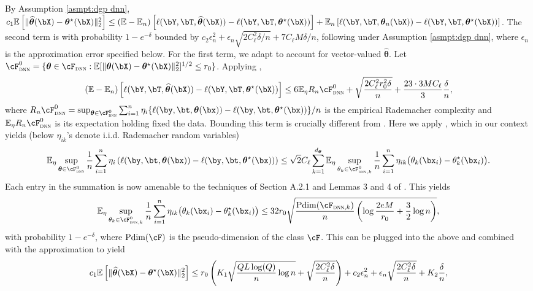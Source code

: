 \documentclass[12pt]{article}
\numberwithin{equation}{section}
\theoremstyle{definition}
\newcommand{\E}{\mathbb{E}}
\newcommand{\btheta}{\boldsymbol{\theta}}
\newcommand{\ttrue}{\theta^\star}
\newcommand{\bttrue}{\btheta^\star}
\newcommand{\bthat}{\bm{\widehat{\theta}}}
\newcommand{\dtheta}{d_{\btheta}}  %
\begin{document}
By Assumption \ref{asmpt:dgp dnn}, $ c_1 \E \left[ \|\bthat(\bX) - \bttrue (\bX) \|_2^2 \right]  \leq \left( \E - \E_n \right)\left[ \ell(\bY,\bT,\bthat(\bX)) - \ell(\bY,\bT,\bttrue(\bX)) \right] + \E_n \left[ \ell(\bY,\bT,\btheta_n(\bX)) - \ell(\bY,\bT,\bttrue(\bX)) \right]$. 
The second term is with probability $1-e^{-\delta}$ bounded by $c_2 \epsilon_n^2 + \epsilon_n \sqrt{ 2C_\ell^2 \delta  / n} + 7 C_\ell M \delta/n$, following \cite[Equation (A.2)]{Farrell-Liang-Misra2021_Ecma} under Assumption \ref{asmpt:dgp dnn}, where $\epsilon_n$ is the approximation error specified below. For the first term, we adapt \cite{Farrell-Liang-Misra2021_Ecma} to account for vector-valued $\bthat$. Let $\cF^0_{\textsc{dnn}} = \{ \btheta \in \cF_{\textsc{dnn}} : \E[ \|\btheta(\bX) - \bttrue (\bX) \|_2^2 ]^{1/2} \leq r_0\}$. Applying \cite{bartlett2005local},
\[
	\left( \E - \E_n \right)\left[ \ell(\bY,\bT,\bthat(\bX)) - \ell(\bY,\bT,\bttrue(\bX)) \right]
	\leq 6 \E_\eta R_n \cF^0_{\textsc{dnn}}  + \sqrt{\frac{2 C_\ell^2 r_0^2 \delta}{n}} + \frac{23 \cdot 3 M C_\ell}{3} \frac{\delta}{n},
\]
where 
$
    R_n \cF^0_{\textsc{dnn}}  = \sup_{\btheta \in  \cF^0_{\textsc{dnn}} }\sum_{i=1}^n \eta_i  \{ \ell(\by,\bt,\btheta(\bx)) - \ell(\by,\bt,\bttrue(\bx)) \} /n
$
is the empirical Rademacher complexity and $\E_\eta R_n \cF^0_{\textsc{dnn}}$ is its expectation holding fixed the data. Bounding this term is crucially different from \cite{Farrell-Liang-Misra2021_Ecma}. Here we apply \cite[Corollary 1]{Maurer2016VectorContraction}, which in our context yields (below $\eta_{ik}$'s denote i.i.d. Rademacher random variables)
\[
    \E_{\eta} \sup_{\btheta \in  \cF^0_{\textsc{dnn}} } \frac{1}{n}\sum_{i=1}^n \eta_i \left( \ell(\by,\bt,\btheta(\bx)) - \ell(\by,\bt,\bttrue(\bx)) \right) 
    \leq \sqrt{2}C_\ell \sum_{k=1}^{\dtheta} \E_{\eta} \sup_{\theta_k \in \cF^0_{\textsc{dnn},k}} \frac{1}{n} \sum_{i=1}^n \eta_{ik} \big(\theta_k(\bx_i) - \ttrue_k(\bx_i) \big).
\]
Each entry in the summation is now amenable to the techniques of Section A.2.1 and Lemmas 3 and 4 of \cite{Farrell-Liang-Misra2021_Ecma}. This yields
\[
    \E_{\eta} \sup_{\theta_k \in \cF^0_{\textsc{dnn},k}} \frac{1}{n} \sum_{i=1}^n \eta_{ik} \big(\theta_k(\bx_i) - \ttrue_k(\bx_i) \big) \leq 32 r_0 \sqrt{\frac{{\rm Pdim}(\cF_{\textsc{dnn},k})}{n} \left( \log \frac{2eM}{r_0} + \frac{3}{2} \log n \right) } ,   
\]
with probability $1 - e^{-\delta}$, where ${\rm Pdim}(\cF)$ is the pseudo-dimension of the class $\cF$. This can be plugged into the above and combined with the approximation to yield 
\[
	c_1 \E \left[ \|\bthat(\bX) - \bttrue (\bX) \|_2^2 \right]  \leq r_0  \left( K_1 \sqrt{ \frac{ Q L \log(Q) }{n}  \log n}  + \sqrt{\frac{2 C_\ell^2 \delta}{n}} \right) + c_2 \epsilon_n^2 + \epsilon_n \sqrt{\frac{2C_\ell^2 \delta }{n}} + K_2 \frac{ \delta}{n},
\]
\end{document}
